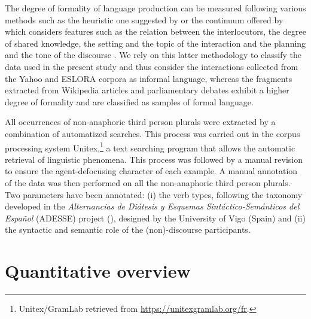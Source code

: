 \documentclass[output=paper]{langscibook}
\begin{document}
The degree of formality of language production can be measured following various methods such as the heuristic one suggested by \citet{HeylighenDewaele1999} or the continuum offered by \citet{Briz2010} which considers features such as the relation between the interlocutors, the degree of shared knowledge, the setting and the topic of the interaction and the planning and the tone of the discourse \citep{Briz2010}. We rely on this latter methodology to classify the data used in the present study and thus consider the interactions collected from the Yahoo and ESLORA corpora as informal language, whereas the fragments extracted from Wikipedia articles and parliamentary debates exhibit a higher degree of formality and are classified as samples of formal language.


All occurrences of non-anaphoric third person plurals were extracted by a combination of automatized searches. This process was carried out in the corpus processing system Unitex,\footnote{Unitex/GramLab retrieved from \url{https://unitexgramlab.org/fr}.} a text searching program that allows the automatic retrieval of linguistic phenomena. This process was followed by a manual revision to ensure the agent-defocusing character of each example. A manual annotation of the data was then performed on all the non-anaphoric third person plurals. Two parameters have been annotated: (i) the verb types, following the taxonomy developed in the \textit{Alternancias de Diátesis y Esquemas Sintáctico-Semánticos del Español} (ADESSE) project (\citealt{García-MiguelAlbertuz2005}), designed by the University of Vigo (Spain) and (ii) the syntactic and semantic role of the (non)-discourse participants.



\section{Quantitative overview}\label{sec:pierre:3}
\end{document}
